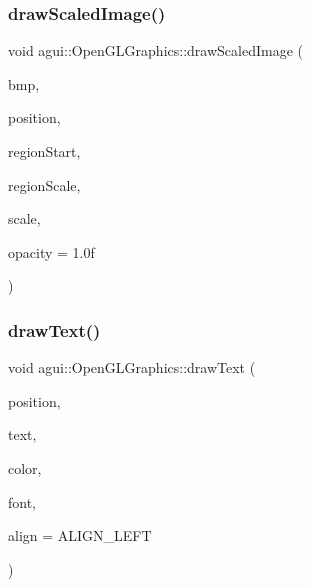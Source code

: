 \mbox{\label{classagui_1_1_open_g_l_graphics_a0b7bde4bebc7566ff78f04b5656c38b9}} 
\subsubsection{\texorpdfstring{draw\+Scaled\+Image()}{drawScaledImage()}}
{\footnotesize\ttfamily void agui\+::\+Open\+G\+L\+Graphics\+::draw\+Scaled\+Image (\begin{DoxyParamCaption}\item[{const \mbox{\hyperlink{class_image}{Image}} $\ast$}]{bmp,  }\item[{const Point \&}]{position,  }\item[{const Point \&}]{region\+Start,  }\item[{const Dimension \&}]{region\+Scale,  }\item[{const Dimension \&}]{scale,  }\item[{const float \&}]{opacity = {\ttfamily 1.0f} }\end{DoxyParamCaption})\hspace{0.3cm}{\ttfamily [override]}}

\mbox{\label{classagui_1_1_open_g_l_graphics_a454da19b9133ed6ca6defea2abc832c4}} 
\subsubsection{\texorpdfstring{draw\+Text()}{drawText()}}
{\footnotesize\ttfamily void agui\+::\+Open\+G\+L\+Graphics\+::draw\+Text (\begin{DoxyParamCaption}\item[{const Point \&}]{position,  }\item[{const char $\ast$}]{text,  }\item[{const Color \&}]{color,  }\item[{const \mbox{\hyperlink{class_font}{Font}} $\ast$}]{font,  }\item[{Alignment\+Enum}]{align = {\ttfamily ALIGN\+\_\+LEFT} }\end{DoxyParamCaption})\hspace{0.3cm}{\ttfamily [override]}}

